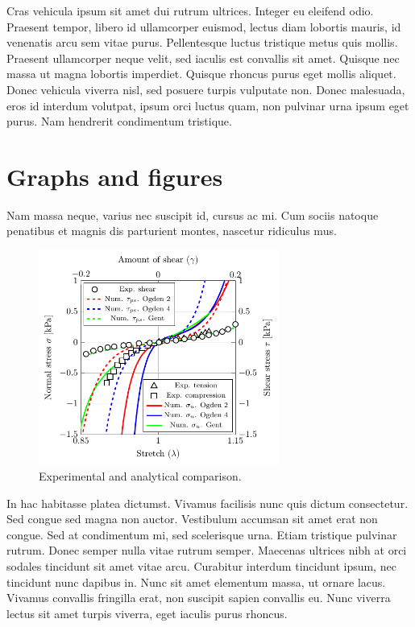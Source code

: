 Cras vehicula ipsum sit amet dui rutrum ultrices. Integer eu eleifend odio. Praesent tempor, libero id ullamcorper euismod, lectus diam lobortis mauris, id venenatis arcu sem vitae purus. Pellentesque luctus tristique metus quis mollis. Praesent ullamcorper neque velit, sed iaculis est convallis sit amet. Quisque nec massa ut magna lobortis imperdiet. Quisque rhoncus purus eget mollis aliquet. Donec vehicula viverra nisl, sed posuere turpis vulputate non. Donec malesuada, eros id interdum volutpat, ipsum orci luctus quam, non pulvinar urna ipsum eget purus. Nam hendrerit condimentum tristique.

\section{Graphs and figures}

Nam massa neque, varius nec suscipit id, cursus ac mi. Cum sociis natoque penatibus et magnis dis parturient montes, nascetur ridiculus mus. 

\begin{figure}[H]
\centering
\includegraphics[width=0.7\textwidth]{figures/chapter_1/graphs/Corona_radiata/graph_corona_radiata.pdf}
\caption[tab]{Experimental and analytical comparison.}
\label{fig:corona_radiata}
\end{figure}

In hac habitasse platea dictumst. Vivamus facilisis nunc quis dictum consectetur. Sed congue sed magna non auctor. Vestibulum accumsan sit amet erat non congue. Sed at condimentum mi, sed scelerisque urna. Etiam tristique pulvinar rutrum. Donec semper nulla vitae rutrum semper. Maecenas ultrices nibh at orci sodales tincidunt sit amet vitae arcu. Curabitur interdum tincidunt ipsum, nec tincidunt nunc dapibus in. Nunc sit amet elementum massa, ut ornare lacus. Vivamus convallis fringilla erat, non suscipit sapien convallis eu. Nunc viverra lectus sit amet turpis viverra, eget iaculis purus rhoncus.


